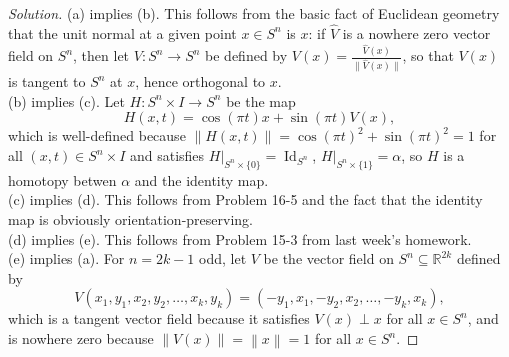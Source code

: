 \documentclass[10pt]{article}
\providecommand{\RR}{\mathbb R}
\newenvironment{soln}{\begin{proof}[Solution]}{\end{proof}}
\providecommand{\norm}[1]{\left\| #1\right\|}
\providecommand{\smnorm}[1]{\| #1\|}
\begin{document}
\begin{soln}
    (a) implies (b). This follows from the basic fact of Euclidean geometry
    that the unit normal at a given point $x\in S^n$ is $x$:
    if $\hat V$ is a nowhere zero vector field on $S^n$,
    then let $V\colon S^n\to S^n$ be defined by
    $V(x) = \frac{\hat V(x)}{\smnorm{\hat V(x)}}$,
    so that $V(x)$ is tangent to $S^n$ at $x$, hence orthogonal to $x$.\\

    (b) implies (c).
    Let $H\colon S^n\times I\to S^n$ be the map
    \begin{equation*}
        H(x,t) = \cos(\pi t)x + \sin(\pi t)V(x),
    \end{equation*}
    which is well-defined because
    $\norm{H(x,t)} = \cos(\pi t)^2 + \sin(\pi t)^2 = 1$ for all
    $(x,t)\in S^n\times I$
    and satisfies $H|_{S^n\times\{0\}} = \operatorname{Id}_{S^n}$,
    $H|_{S^n\times\{1\}} = \alpha$,
    so $H$ is a homotopy betwen $\alpha$ and the identity map.
    \\

    (c) implies (d). This follows from Problem 16-5
    and the fact that the identity map is obviously orientation-preserving.
    \\

    (d) implies (e). This follows from Problem 15-3
    from last week's homework.
    \\

    (e) implies (a). For $n = 2k - 1$ odd, let
    $V$ be the vector field on $S^n\subseteq\RR^{2k}$ defined by
    \begin{equation*}
        V(x_1,y_1,x_2,y_2,\dots,x_k,y_k) =
	(-y_1,x_1,-y_2,x_2,\dots,-y_k,x_k),
    \end{equation*}
    which is a tangent vector field because it
    satisfies $V(x)\perp x$ for all $x\in S^n$, and is nowhere zero
    because $\norm{V(x)} = \norm{x} = 1$ for all $x\in S^n$.
\end{soln}
\end{document}
